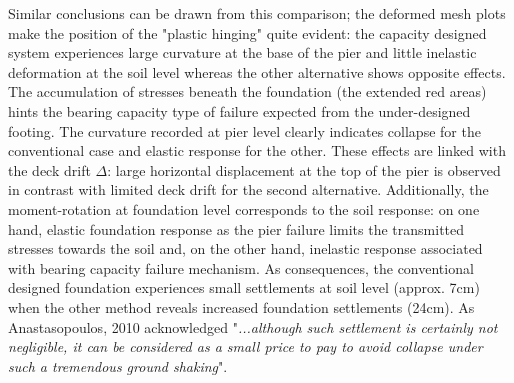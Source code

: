 \documentclass[12pt,a4paper]{report}
\begin{document}
Similar conclusions can be drawn from this comparison; the deformed mesh plots make the position of the "plastic hinging" quite evident: the capacity designed system experiences large curvature at the base of the pier and little inelastic deformation at the soil level whereas the other alternative shows opposite effects. The accumulation of stresses beneath the foundation (the extended red areas) hints the bearing capacity type of failure expected from the under-designed footing. The curvature recorded at pier level clearly indicates collapse for the conventional case and elastic response for the other. These effects are linked with the deck drift $\Delta$: large horizontal displacement at the top of the pier is observed in contrast with limited deck drift for the second alternative. Additionally, the moment-rotation at foundation level corresponds to the soil response: on one hand, elastic foundation response as the pier failure limits the transmitted stresses towards the soil and, on the other hand, inelastic response associated with bearing capacity failure mechanism. As consequences, the conventional designed foundation experiences small settlements at soil level (approx. 7cm) when the other method reveals increased foundation settlements (24cm). As Anastasopoulos, 2010 \cite{anastasopoulos2010soil} acknowledged "\textit{...although such settlement is certainly not negligible, it can be considered as a small price to pay to avoid collapse under such a tremendous ground shaking}".
\end{document}
